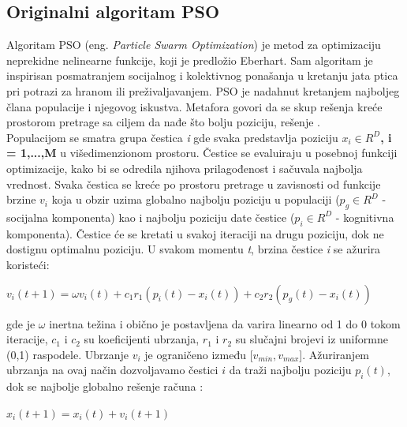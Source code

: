 \documentclass[a4paper]{article}
\begin{document}
{\subsection{Originalni algoritam PSO}
\label{subsec:opso}
Algoritam PSO (eng. \textit{Particle Swarm Optimization}) je metod za optimizaciju neprekidne nelinearne funkcije, koji je predložio Eberhart.
Sam algoritam je inspirisan posmatranjem socijalnog i kolektivnog ponašanja u kretanju jata ptica pri potrazi za hranom ili preživaljavanjem.
PSO je nadahnut kretanjem najboljeg člana populacije i njegovog iskustva. Metafora govori da se skup rešenja kreće prostorom pretrage 
sa ciljem da nađe što bolju poziciju, rešenje \cite{hindawi}.
\\
Populacijom se smatra grupa čestica \textit{i} gde svaka predstavlja poziciju \textbf{\textbf{$x_i \in R^D$, i = 1,...,M}} u višedimenzionom prostoru.
Čestice se evaluiraju u posebnoj funkciji optimizacije, kako bi se odredila njihova prilagođenost i sačuvala najbolja vrednost. Svaka čestica se kreće po
prostoru pretrage u zavisnosti od funkcije brzine \textbf{$v_i$} koja u obzir uzima globalno najbolju poziciju u populaciji ($p_g \in R^D$ - socijalna
komponenta) kao i najbolju poziciju date čestice ($p_i \in R^D$ - kognitivna komponenta). Čestice će se kretati u svakoj iteraciji na drugu poziciju,
dok ne dostignu optimalnu poziciju. U svakom momentu \textit{t}, brzina čestice \textit{i} se ažurira koristeći: 
\begin{center}
\textbf\textit{$v_i(t+1) = \omega v_i(t) + c_1 r_1(p_i (t) - x_i (t)) + c_2 r_2 (p_g (t) - x_i (t))$}
\end{center}
gde je $\omega$ inertna težina i obično je postavljena da varira linearno od 1 do 0 tokom iteracije, $c_1$ i $c_2$ su koeficijenti ubrzanja, $r_1$ i $r_2$
su slučajni brojevi iz uniformne (0,1) raspodele. Ubrzanje \textbf{$v_i$} je ograničeno između [$v_{min}, v_{max}$]. Ažuriranjem ubrzanja na ovaj 
način dozvoljavamo čestici $i$ da traži najbolju poziciju \textbf{$p_i(t)$}, dok se najbolje globalno rešenje računa \cite{hindawi}:
\begin{center}
\textbf\textit{$x_i(t+1) = x_i(t) + v_i(t+1)$}
\end{center} 



}
\end{document}

